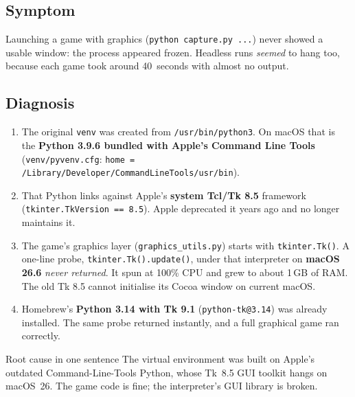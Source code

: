 \documentclass[11pt,a4paper]{article}
\begin{document}
\subsection{Symptom}
Launching a game with graphics (\texttt{python capture.py ...}) never showed a usable window: the
process appeared frozen. Headless runs \emph{seemed} to hang too, because each game took around
40~seconds with almost no output.

\subsection{Diagnosis}
\begin{enumerate}
  \item The original \texttt{venv} was created from \texttt{/usr/bin/python3}. On macOS that is the
        \textbf{Python 3.9.6 bundled with Apple's Command Line Tools}
        (\texttt{venv/pyvenv.cfg}: \nolinkurl{home = /Library/Developer/CommandLineTools/usr/bin}).
  \item That Python links against Apple's \textbf{system Tcl/Tk 8.5} framework
        (\texttt{tkinter.TkVersion == 8.5}). Apple deprecated it years ago and no longer maintains it.
  \item The game's graphics layer (\texttt{graphics\_utils.py}) starts with \texttt{tkinter.Tk()}.
        A one-line probe, \texttt{tkinter.Tk().update()}, under that interpreter on
        \textbf{macOS 26.6} \emph{never returned}. It spun at 100\% CPU and grew to about
        1\,GB of RAM. The old Tk 8.5 cannot initialise its Cocoa window on current macOS.
  \item Homebrew's \textbf{Python 3.14 with Tk 9.1} (\texttt{python-tk@3.14}) was already installed.
        The same probe returned instantly, and a full graphical game ran correctly.
\end{enumerate}

\begin{keybox}{Root cause in one sentence}
The virtual environment was built on Apple's outdated Command-Line-Tools Python, whose Tk~8.5 GUI
toolkit hangs on macOS~26. The game code is fine; the interpreter's GUI library is broken.
\end{keybox}
\end{document}
